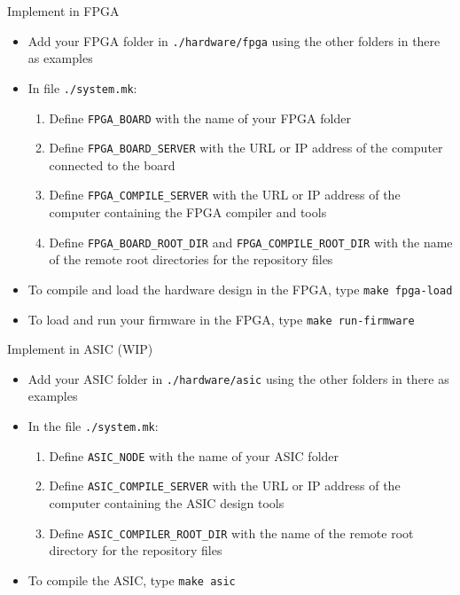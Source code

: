 \documentclass [xcolor=svgnames, t] {beamer}
\begin{document}
\begin{frame}{Implement in FPGA}
\begin{itemize}
  \item Add your FPGA folder in {\tt ./hardware/fpga} using the other folders in there as examples
  \item In file {\tt ./system.mk}:
  \begin{enumerate}
    \item Define {\tt FPGA\_BOARD} with the name of your FPGA folder
    \item Define {\tt FPGA\_BOARD\_SERVER} with the URL or IP address of the computer connected to the board
    \item Define {\tt FPGA\_COMPILE\_SERVER} with the URL or IP address of the computer containing the FPGA compiler and tools
    \item Define {\tt FPGA\_BOARD\_ROOT\_DIR} and {\tt FPGA\_COMPILE\_ROOT\_DIR} with the name of the remote root directories for the repository files
  \end{enumerate}
  \item To compile and load the hardware design in the FPGA, type {\tt make fpga-load}
  \item To load and run your firmware in the FPGA, type {\tt make run-firmware}
\end{itemize}
\end{frame}

\begin{frame}{Implement in ASIC (WIP)}
\begin{itemize}
  \item Add your ASIC folder in {\tt ./hardware/asic} using the other folders in there as examples
  \item In the file {\tt ./system.mk}:
  \begin{enumerate}
     \item Define {\tt ASIC\_NODE} with the name of your ASIC folder
     \item Define {\tt ASIC\_COMPILE\_SERVER} with the URL or IP address of the computer containing the ASIC design tools
     \item Define {\tt ASIC\_COMPILER\_ROOT\_DIR} with the name of the remote root directory for the repository files
  \end{enumerate}
  \item To compile the ASIC, type {\tt make asic}
\end{itemize}
\end{frame}
\end{document}
